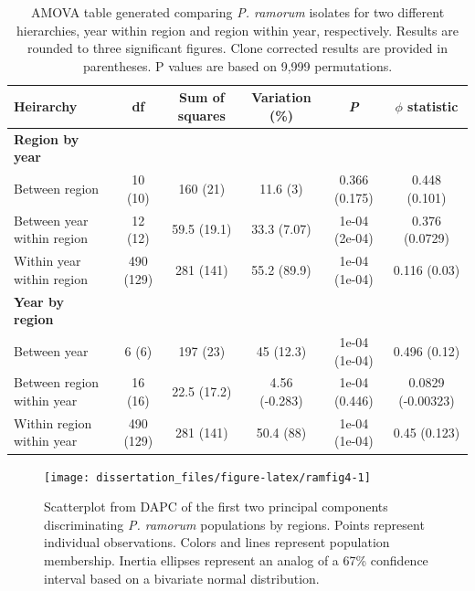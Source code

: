 \documentclass[double,11pt]{beavtex}
\begin{document}
  \begin{table}
  \centering
  \caption[AMOVA table generated comparing \textit{P. ramorum} isolates for
  two different hierarchies]{AMOVA table generated comparing \emph{P. ramorum} isolates for two
  different hierarchies, year within region and region within year,
  respectively. Results are rounded to three significant figures. Clone
  corrected results are provided in parentheses. P values are based on
  9,999 permutations.} 
  \label{tab:ramtab4}
  \begin{tabular}{lccccc}
   \textbf{Heirarchy} & \textbf{df} & \textbf{Sum of squares} & \textbf{Variation (\%)} & \textbf{\textit{P}} & \textbf{$\phi$ statistic} \\ 
    \midrule
  \textbf{Region by year} &  &  &  &  &  \\ 
    Between region & 10 (10) & 160 (21) & 11.6 (3) & 0.366 (0.175) & 0.448 (0.101) \\ 
    Between year within region & 12 (12) & 59.5 (19.1) & 33.3 (7.07) & 1e-04 (2e-04) & 0.376 (0.0729) \\ 
    Within year within region & 490 (129) & 281 (141) & 55.2 (89.9) & 1e-04 (1e-04) & 0.116 (0.03) \\ 
    \textbf{Year by region} &  &  &  &  &  \\ 
    Between year & 6 (6) & 197 (23) & 45 (12.3) & 1e-04 (1e-04) & 0.496 (0.12) \\ 
    Between region within year & 16 (16) & 22.5 (17.2) & 4.56 (-0.283) & 1e-04 (0.446) & 0.0829 (-0.00323) \\ 
    Within region within year & 490 (129) & 281 (141) & 50.4 (88) & 1e-04 (1e-04) & 0.45 (0.123) \\ 
     \bottomrule
  \end{tabular}
  \end{table}
  
  \begin{figure}
  
  {\centering \texttt{[image: dissertation\_files/figure-latex/ramfig4-1]} 
  
  }
  
  \caption[Scatterplot from DAPC of the first two principal components
  discriminating \emph{P. ramorum} populations by regions.]{Scatterplot from DAPC of the first two principal components
  discriminating \emph{P. ramorum} populations by regions. Points
  represent individual observations. Colors and lines represent population
  membership. Inertia ellipses represent an analog of a 67\% confidence
  interval based on a bivariate normal distribution.}\label{fig:ramfig4}
  \end{figure}
  
\end{document}
